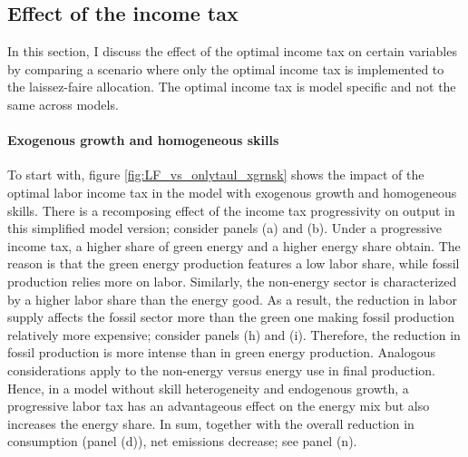 


\subsection{Effect of the income tax}
In this section, I discuss the effect of the optimal income tax on certain variables by comparing a scenario where only the optimal income tax is implemented to the laissez-faire allocation. The optimal income tax is model specific and not the same across models.

\paragraph{Exogenous growth and homogeneous skills}
To start with, figure \ref{fig:LF_vs_onlytaul_xgrnsk} shows the impact of the optimal labor income tax in the model with exogenous growth and homogeneous skills. 
There is a recomposing effect of the income tax progressivity on output in this simplified model version; consider panels (a) and (b). Under a progressive income tax, a higher share of green energy and a higher energy share obtain. %
The reason is that the green energy production features a low labor share, while fossil production relies more on labor. Similarly, the non-energy sector is characterized by a higher labor share than the energy good. As a result, the reduction in labor supply affects the fossil sector more than the green one making fossil production relatively more expensive; consider panels (h) and (i).  Therefore, the reduction in fossil production is more intense than in green energy production. Analogous considerations apply to the non-energy versus energy use in final production.
Hence, in a model without skill heterogeneity and endogenous growth, a progressive labor tax has an advantageous effect on the energy mix but also increases the energy share. In sum, together with the overall reduction in consumption (panel (d)), net emissions decrease; see panel (n).


